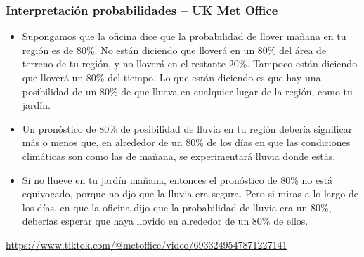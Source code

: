 \documentclass[table]{beamer}
\begin{document}
\begin{frame}
    \frametitle{Interpretación probabilidades -- UK Met Office}
    \begin{block}{}
        \begin{itemize}
            \item
                Supongamos que la oficina dice que la probabilidad de llover mañana en
                tu región es de $80\%$.
                No están diciendo que lloverá en un $80\%$ del área de terreno de tu región,
                y no lloverá en el restante $20\%$. Tampoco están diciendo que lloverá un $80\%$ del tiempo.
                Lo que están diciendo es que hay una posibilidad de un $80\%$ de que llueva
                en cualquier lugar de la región, como tu jardín.
            \item
                Un pronóstico de $80\%$ de posibilidad de lluvia en tu región debería significar más o menos
                que, en alrededor de un $80\%$ de los días en que las condiciones climáticas son como las de mañana,
                se experimentará lluvia donde estás.
            \item
                Si no llueve en tu jardín mañana, entonces el pronóstico de $80\%$ no está equivocado,
                porque no djo que la lluvia era segura. Pero si miras a lo largo de los días, en que
                la oficina dijo que la probabilidad de lluvia era un $80\%$, deberías esperar que
                haya llovido en alrededor de un $80\%$ de ellos.
        \end{itemize}
    \end{block}
    \url{https://www.tiktok.com/@metoffice/video/6933249547871227141}
\end{frame}

\end{document}
